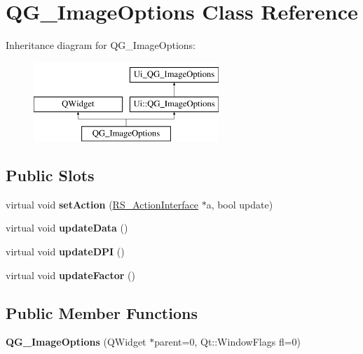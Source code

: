 \hypertarget{classQG__ImageOptions}{\section{Q\-G\-\_\-\-Image\-Options Class Reference}
\label{classQG__ImageOptions}
}
Inheritance diagram for Q\-G\-\_\-\-Image\-Options\-:\begin{figure}[H]
\begin{center}
\leavevmode
\includegraphics[height=3.000000cm]{classQG__ImageOptions}
\end{center}
\end{figure}
\subsection*{Public Slots}
\begin{DoxyCompactItemize}
\item 
\hypertarget{classQG__ImageOptions_a5fd62e96b922c9f05c0db5ca5b7e42ec}{virtual void {\bfseries set\-Action} (\hyperlink{classRS__ActionInterface}{R\-S\-\_\-\-Action\-Interface} $\ast$a, bool update)}\label{classQG__ImageOptions_a5fd62e96b922c9f05c0db5ca5b7e42ec}

\item 
\hypertarget{classQG__ImageOptions_aefa6890e832a983592785f741bfa42dc}{virtual void {\bfseries update\-Data} ()}\label{classQG__ImageOptions_aefa6890e832a983592785f741bfa42dc}

\item 
\hypertarget{classQG__ImageOptions_a928bfaee607e8a614e82bd1e01e4b1f5}{virtual void {\bfseries update\-D\-P\-I} ()}\label{classQG__ImageOptions_a928bfaee607e8a614e82bd1e01e4b1f5}

\item 
\hypertarget{classQG__ImageOptions_ae03d6c21669f02bb2ac4f67d84c009a2}{virtual void {\bfseries update\-Factor} ()}\label{classQG__ImageOptions_ae03d6c21669f02bb2ac4f67d84c009a2}

\end{DoxyCompactItemize}
\subsection*{Public Member Functions}
\begin{DoxyCompactItemize}
\item 
\hypertarget{classQG__ImageOptions_a4b150c5e54c9498f0805164687f4d06e}{{\bfseries Q\-G\-\_\-\-Image\-Options} (Q\-Widget $\ast$parent=0, Qt\-::\-Window\-Flags fl=0)}\label{classQG__ImageOptions_a4b150c5e54c9498f0805164687f4d06e}

\end{DoxyCompactItemize}
